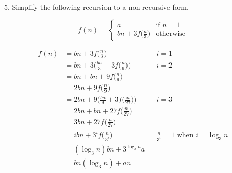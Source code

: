 \documentclass[12pt]{article}
\begin{document}
\begin{flushleft}
5. Simplify the following recursion to a non-recursive form.
\end{flushleft}
\begin{center}
$$f(n)=
\begin{cases}
a & \text{if } n=1\\
bn+3f\big(\frac{n}{3}\big) & \text{otherwise}
\end{cases}
$$
\end{center}
\begin{align*}
f(n)&=bn+3f\Big(\frac{n}{3}\Big) && i=1\\
&=bn+3\bigg(\frac{bn}{3}+3f\Big(\frac{n}{9}\Big)\bigg) &&i=2\\
&=bn+bn+9f\Big(\frac{n}{9}\Big)\\
&=2bn+9f\Big(\frac{n}{9}\Big)\\
&=2bn+9\bigg(\frac{bn}{9}+3f\Big(\frac{n}{27}\Big)\bigg) &&i=3\\
&=2bn+bn+27f\Big(\frac{n}{27}\Big)\\
&=3bn+27f\Big(\frac{n}{27}\Big)\\
&=ibn+3^if\Big(\frac{n}{3^i}\Big) &&\frac{n}{3^i}=1 \text{ when } i=\log_{3}n\\
&=(\log_{3}n)bn+3^{\log_{3}n}a\\
&=bn(\log_{3}n)+an\\
\end{align*}
\end{document}
